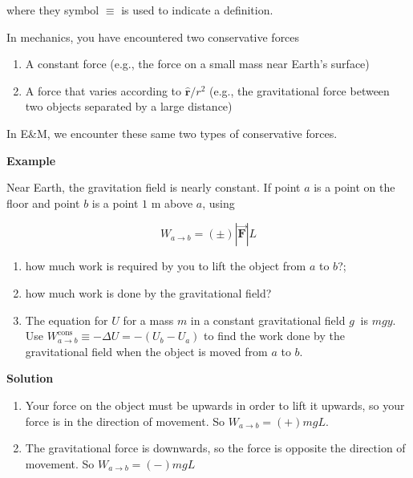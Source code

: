 \documentclass{article}
\newcommand{\rhat}[0]{\hat{\mathbf{r}}}
\newcommand{\bfvec}[1]{\vec{\mathbf{#1}}}
\begin{document}
where they symbol $\equiv$ is used to indicate a definition.

In mechanics, you have encountered two conservative forces

\begin{enumerate}

  \item A constant force (e.g., the force on a small mass near Earth's surface)

  \item A force that varies according to $\rhat/r^2$ (e.g., the gravitational force between two objects separated by a large distance)

\end{enumerate}

In E&M, we encounter these same two types of conservative forces.

\textbf{Example}

Near Earth, the gravitation field is nearly constant. If point $a$ is a point on the floor and point $b$ is a point $1\text{ m}$ above $a$, using

\begin{equation}W_{a\rightarrow b}=(\pm)|\bfvec{F}|L\end{equation}

\begin{enumerate}

  \item how much work is required by you to lift the object from $a$ to $b$?;

  \item how much work is done by the gravitational field?

  \item The equation for $U$ for a mass $m$ in a constant gravitational field $g~$ is $mgy$. Use $W_{a\rightarrow b}^{\text{cons}} \equiv -\Delta U = -(U_b-U_a)$ to find the work done by the gravitational field when the object is moved from $a$ to $b$.

\end{enumerate}

\textbf{Solution}

\begin{enumerate}

  \item Your force on the object must be upwards in order to lift it upwards, so your force is in the direction of movement. So $W_{a\rightarrow b}=(+)mgL$.

  \item The gravitational force is downwards, so the force is opposite the direction of movement. So $W_{a\rightarrow b}=(-)mgL$

\end{enumerate}
\end{document}
